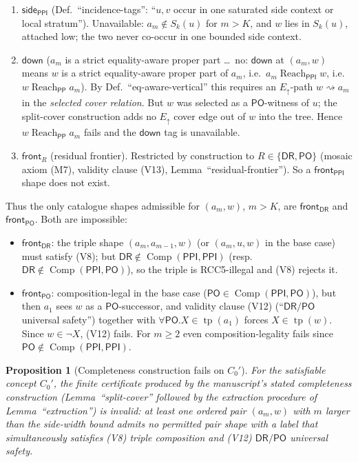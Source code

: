 \documentclass[11pt]{article}
\newtheorem{proposition}[theorem]{Proposition}
\newcommand{\DR}{\mathsf{DR}}
\newcommand{\PO}{\mathsf{PO}}
\newcommand{\PP}{\mathsf{PP}}
\newcommand{\PPI}{\mathsf{PPI}}
\newcommand{\comp}{\operatorname{Comp}}
\newcommand{\reach}{\operatorname{Reach}}
\newcommand{\tp}{\operatorname{tp}}
\newcommand{\Eup}{E_{\uparrow}}
\newcommand{\down}{\mathsf{down}}
\newcommand{\sidetag}{\mathsf{side}}
\newcommand{\fronttag}{\mathsf{front}}
\begin{document}
\begin{enumerate}[label=(\arabic*)]
\item \textbf{$\sidetag_{\PPI}$} (Def.~``incidence-tags'': ``$u,v$ occur in one
saturated side context or local stratum''). Unavailable: $a_m\notin S_k(u)$ for
$m>K$, and $w$ lies in $S_k(u)$, attached low; the two never co-occur in one
bounded side context.

\item \textbf{$\down$} ($a_m$ is a strict equality-aware proper part \dots\ no:
$\down$ at $(a_m,w)$ means $w$ is a strict equality-aware proper part of $a_m$,
i.e.\ $a_m\reach_{\PPI}w$, i.e.\ $w\reach_{\PP}a_m$).  By
Def.~``eq-aware-vertical'' this requires an $\Eup$-path
$w\rightsquigarrow a_m$ in the \emph{selected cover relation}.  But $w$ was
selected as a $\PO$-witness of $u$; the split-cover construction adds no $\Eup$
cover edge out of $w$ into the tree.  Hence $w\reach_{\PP}a_m$ fails and the
$\down$ tag is unavailable.

\item \textbf{$\fronttag_{R}$} (residual frontier).  Restricted by construction
to $R\in\{\DR,\PO\}$ (mosaic axiom (M7), validity clause (V13),
Lemma~``residual-frontier'').  So a $\fronttag_{\PPI}$ shape does not exist.
\end{enumerate}

Thus the only catalogue shapes admissible for $(a_m,w)$, $m>K$, are
$\fronttag_{\DR}$ and $\fronttag_{\PO}$.  Both are impossible:
\begin{itemize}
\item $\fronttag_{\DR}$: the triple shape $(a_m,a_{m-1},w)$ (or
$(a_m,u,w)$ in the base case) must satisfy (V8); but
$\DR\notin\comp(\PPI,\PPI)$ (resp.\ $\DR\notin\comp(\PPI,\PO)$), so the triple is
RCC5-illegal and (V8) rejects it.
\item $\fronttag_{\PO}$: composition-legal in the base case
($\PO\in\comp(\PPI,\PO)$), but then $a_1$ sees $w$ as a $\PO$-successor, and
validity clause (V12) (``$\DR/\PO$ universal safety'') together with
$\forall\PO.X\in\tp(a_1)$ forces $X\in\tp(w)$.  Since $w\in\neg X$, (V12) fails.
For $m\ge2$ even composition-legality fails since $\PO\notin\comp(\PPI,\PPI)$.
\end{itemize}

\begin{proposition}[Completeness construction fails on $C_0'$]
\label{prop:fail}
For the satisfiable concept $C_0'$, the finite certificate produced by the
manuscript's stated completeness construction (Lemma~``split-cover'' followed by
the extraction procedure of Lemma~``extraction'') is invalid: at least one
ordered pair $(a_m,w)$ with $m$ larger than the side-width bound admits no
permitted pair shape with a label that simultaneously satisfies (V8) triple
composition and (V12) $\DR/\PO$ universal safety.
\end{proposition}
\end{document}
